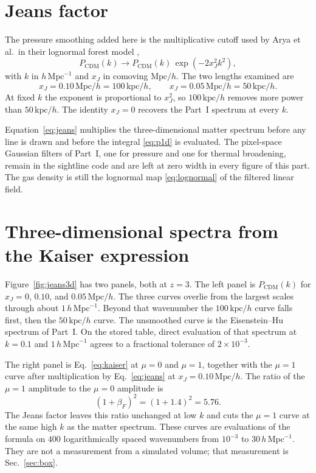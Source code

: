 \documentclass[11pt]{article}
\begin{document}
\section{Jeans factor}
\label{sec:jeans}

The pressure smoothing added here is the multiplicative cutoff used by Arya et al.\ in their lognormal forest model \citep{Arya:2022uke},
\begin{equation}
\label{eq:jeans}
P_\mathrm{CDM}(k)
\to
P_\mathrm{CDM}(k)\,\exp(-2 x_J^{2} k^{2}),
\end{equation}
with $k$ in $h\,\mathrm{Mpc}^{-1}$ and $x_J$ in comoving $\mathrm{Mpc}/h$.
The two lengths examined are
\begin{equation}
x_J = 0.10\,\mathrm{Mpc}/h = 100\,\mathrm{kpc}/h,
\qquad
x_J = 0.05\,\mathrm{Mpc}/h = 50\,\mathrm{kpc}/h.
\end{equation}
At fixed $k$ the exponent is proportional to $x_J^{2}$, so $100\,\mathrm{kpc}/h$ removes more power than $50\,\mathrm{kpc}/h$.
The identity $x_J=0$ recovers the Part~I spectrum at every $k$.

Equation~\eqref{eq:jeans} multiplies the three-dimensional matter spectrum before any line is drawn and before the integral \eqref{eq:p1d} is evaluated.
The pixel-space Gaussian filters of Part~I, one for pressure and one for thermal broadening, remain in the sightline code and are left at zero width in every figure of this part.
The gas density is still the lognormal map \eqref{eq:lognormal} of the filtered linear field.

\section{Three-dimensional spectra from the Kaiser expression}
\label{sec:3d}

Figure~\ref{fig:jeans3d} has two panels, both at $z=3$.
The left panel is $P_\mathrm{CDM}(k)$ for $x_J=0$, $0.10$, and $0.05\,\mathrm{Mpc}/h$.
The three curves overlie from the largest scales through about $1\,h\,\mathrm{Mpc}^{-1}$.
Beyond that wavenumber the $100\,\mathrm{kpc}/h$ curve falls first, then the $50\,\mathrm{kpc}/h$ curve.
The unsmoothed curve is the Eisenstein--Hu spectrum of Part~I.
On the stored table, direct evaluation of that spectrum at $k=0.1$ and $1\,h\,\mathrm{Mpc}^{-1}$ agrees to a fractional tolerance of $2\times 10^{-3}$.

The right panel is Eq.~\eqref{eq:kaiser} at $\mu=0$ and $\mu=1$, together with the $\mu=1$ curve after multiplication by Eq.~\eqref{eq:jeans} at $x_J=0.10\,\mathrm{Mpc}/h$.
The ratio of the $\mu=1$ amplitude to the $\mu=0$ amplitude is
\begin{equation}
(1+\beta_F)^{2}=(1+1.4)^{2}=5.76.
\end{equation}
The Jeans factor leaves this ratio unchanged at low $k$ and cuts the $\mu=1$ curve at the same high $k$ as the matter spectrum.
These curves are evaluations of the formula on $400$ logarithmically spaced wavenumbers from $10^{-3}$ to $30\,h\,\mathrm{Mpc}^{-1}$.
They are not a measurement from a simulated volume; that measurement is Sec.~\ref{sec:box}.
\end{document}
